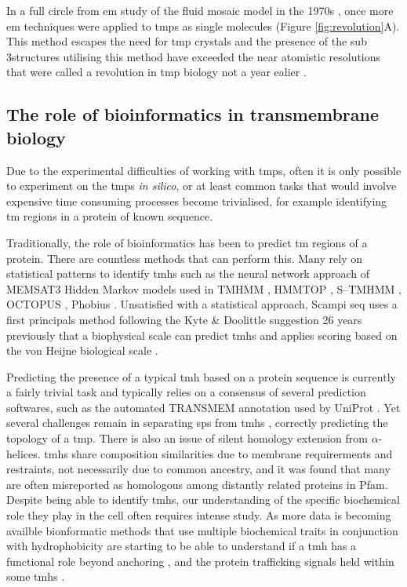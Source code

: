 In a full circle from \gls{em} study of the fluid mosaic model in the 1970s \cite{Singer1972}, once more \gls{em} techniques were applied to \gls{tmp}s as single molecules (Figure \ref{fig:revolution}A).
This method escapes the need for \gls{tmp} crystals \cite{Vinothkumar2015} and the presence of the sub 3\angstrom structures \cite{Grant2015, Bartesaghi2015} utilising this method have exceeded the near atomistic resolutions that were called a revolution in \gls{tmp} biology not a year ealier \cite{Kühlbrandt2014}.


\subsection{The role of bioinformatics in transmembrane biology}

Due to the experimental difficulties of working with \gls{tmp}s, often it is only possible to experiment on the \gls{tmp}s \textit{in silico}, or at least common tasks that would involve expensive time consuming processes become trivialised, for example identifying \gls{tm} regions in a protein of known sequence.

Traditionally, the role of bioinformatics has been to predict \gls{tm} regions of a protein.
There are countless methods that can perform this.
Many rely on statistical patterns to identify \gls{tmh}s such as the neural network approach of MEMSAT3 \cite{Jones2007} Hidden Markov models used in TMHMM \cite{Krogh2001}, HMMTOP \cite{Tusnady2001}, S--TMHMM \cite{Viklund2004}, OCTOPUS \cite{Viklund2008}, Phobius \cite{Kall2004}.
Unsatisfied with a statistical approach, Scampi seq \cite{Bernsel2008} uses a first principals method following the Kyte \& Doolittle suggestion 26 years previously that a biophysical scale can predict \gls{tmh}s \cite{Kyte1982} and applies scoring based on the von Heijne biological scale \cite{Hessa2007}.

Predicting the presence of a typical \gls{tmh} based on a protein sequence is currently a fairly trivial task and typically relies on a consensus of several prediction softwares, such as the automated TRANSMEM annotation used by UniProt \cite{TheUniProtConsortium2014}.
Yet several challenges remain in separating \gls{sp}s from \gls{tmh}s \cite{Petersen2011}, correctly predicting the topology of a \gls{tmp}.
There is also an issue of silent homology extension from $\alpha$\--helices.
\gls{tmh}s share composition similarities due to membrane requirerments and restraints, not necessarily due to common ancestry, and it was found that many are often misreported as homologous among distantly related proteins in Pfam\cite{Wong2010}.
Despite being able to identify \gls{tmh}s, our understanding of the specific biochemical role they play in the cell often requires intense study.
As more data is becoming availble bionformatic methods that use multiple biochemical traits in conjunction with hydrophobicity are starting to be able to understand if a \gls{tmh} has a functional role beyond anchoring \cite{Wong2011, Wong2012}, and the protein trafficking signals held within some \gls{tmh}s \cite{Guna2018}.

